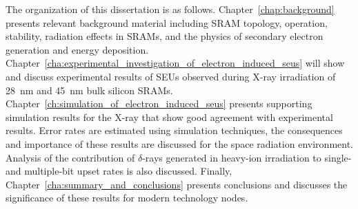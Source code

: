 The organization of this dissertation is as follows. 
Chapter~\ref{chap:background} presents relevant background material including SRAM topology, operation, stability, radiation effects in SRAMs, and the physics of secondary electron generation and energy deposition. 
Chapter~\ref{cha:experimental_investigation_of_electron_induced_seus} will show and discuss experimental results of SEUs observed during X-ray irradiation of 28~nm and 45~nm bulk silicon SRAMs. 
Chapter~\ref{ch:simulation_of_electron_induced_seus} presents supporting simulation results for the X-ray that show good agreement with experimental results. Error rates are estimated using simulation techniques, the consequences and importance of these results are discussed for the space radiation environment.
Analysis of the contribution of $\delta$-rays generated in heavy-ion irradiation to single- and multiple-bit upset rates is also discussed.
Finally, Chapter~\ref{cha:summary_and_conclusions} presents conclusions and discusses the significance of these results for modern technology nodes.
